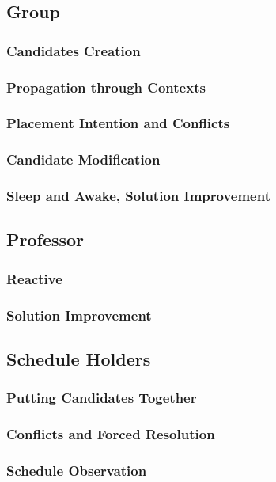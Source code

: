 \documentclass{beamer}
\begin{document}
\subsection{Group}
\subsubsection{Candidates Creation}
\subsubsection{Propagation through Contexts}
\subsubsection{Placement Intention and Conflicts}
\subsubsection{Candidate Modification}
\subsubsection{Sleep and Awake, Solution Improvement}

\subsection{Professor}
\subsubsection{Reactive}
\subsubsection{Solution Improvement}

\subsection{Schedule Holders}
\subsubsection{Putting Candidates Together}
\subsubsection{Conflicts and Forced Resolution}
\subsubsection{Schedule Observation}
\end{document}
